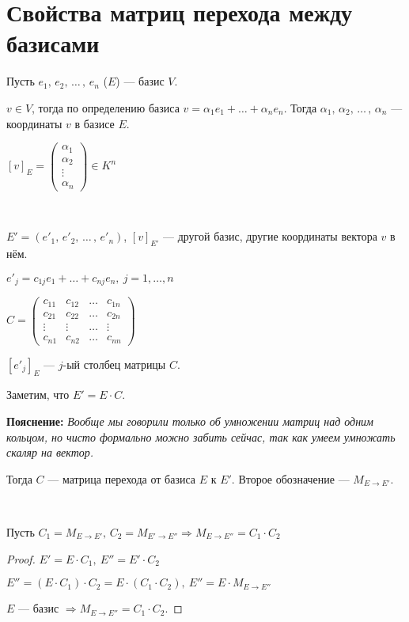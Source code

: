 
\section{Свойства матриц перехода между базисами}

\begin{conj} 
    
    Пусть $e_1,\, e_2,\, \dots\, ,\, e_n$ ($E$) --- базис $V$. 
    
    $v \in V$, тогда по определению базиса $v = \alpha_1 e_1 + \dots + \alpha_n e_n$. 
    Тогда $\alpha_1,\, \alpha_2,\, \dots\, ,\, \alpha_n$ --- координаты $v$ в базисе $E$.

    $[v]_E =
        \begin{pmatrix}
            \alpha_1\\
            \alpha_2\\
            \vdots\\
            \alpha_n
        \end{pmatrix}
    \in K^n$
\end{conj}
\
\begin{conj}


    $E' = (e'_1,\, e'_2,\, \dots\, ,\, e'_n)$, $[v]_{E'}$ --- другой базис, другие координаты вектора $v$ в нём.

    $e'_j = c_{1j}e_1 + \dots + c_{nj}e_n,\ j = 1, \dots, n$

    $C =
        \begin{pmatrix}
            c_{11} & c_{12} & \dots & c_{1n} \\
            c_{21} & c_{22} & \dots & c_{2n} \\
            \vdots & \vdots & \dots & \vdots \\
            c_{n1} & c_{n2} & \dots & c_{nn}
        \end{pmatrix}
    $

    $[e'_j]_E$ --- $j$-ый столбец матрицы $C$.

    Заметим, что $E' = E \cdot C$.


    \textbf{Пояснение:}
    \emph{Вообще мы говорили только об умножении матриц над одним кольцом, 
    но чисто формально можно забить сейчас, так как умеем умножать скаляр на вектор.}

    Тогда $C$ --- матрица перехода от базиса $E$ к $E'$. Второе обозначение --- $M_{E \to E'}$.


\end{conj}
\
\begin{theorem-non} 
    
    Пусть $C_1 = M_{E \to E'}, \, C_2 = M_{E' \to E''} \Longrightarrow M_{E \to E''} = C_1 \cdot C_2$
    \begin{proof}
        
        $E' = E \cdot C_1, \  E'' = E' \cdot C_2$ 

        $E'' = (E \cdot C_1) \cdot C_2 = E \cdot (C_1 \cdot C_2), \  E'' = E \cdot M_{E \to E''}$

        $E$ --- базис $\Longrightarrow M_{E \to E''} = C_1 \cdot C_2$.
    \end{proof}
\end{theorem-non}

